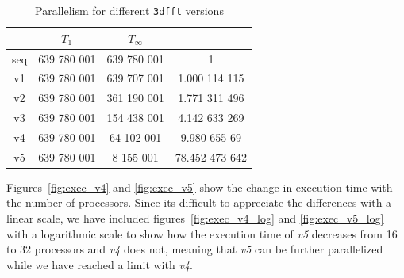 \begin{table}[H]%
    \centering
    \begin{tabular}{cS[table-format=9.]S[table-format=9.]S[table-format=2.9]}
    \toprule
     & {$T_1$} & {$T_\infty$} & {} \\
    \midrule
    seq     & 639 780 001 &  639 780 001 & 1 \\ %
    v1      & 639 780 001 &  639 707 001 & 1.000 114 115 \\ %
    v2      & 639 780 001 &  361 190 001 & 1.771 311 496 \\
    v3      & 639 780 001 &  154 438 001 & 4.142 633 269 \\
    v4      & 639 780 001 &   64 102 001 & 9.980 655 69 \\
    v5      & 639 780 001 &    8 155 001 & 78.452 473 642 \\
    \bottomrule
    \end{tabular}
    \caption{Parallelism for different \texttt{3dfft} versions}
    \label{tab:parallelism}
\end{table}



Figures~\ref{fig:exec_v4} and \ref{fig:exec_v5} show the change in execution time
with the number of processors. Since its difficult to appreciate the differences with a
linear scale, we have included figures~\ref{fig:exec_v4_log} and \ref{fig:exec_v5_log} with
a logarithmic scale to show how the execution time of \emph{v5} decreases from 16 to 32 processors
and \emph{v4} does not, meaning that \emph{v5} can be further parallelized while we have reached a limit
with \emph{v4}.

